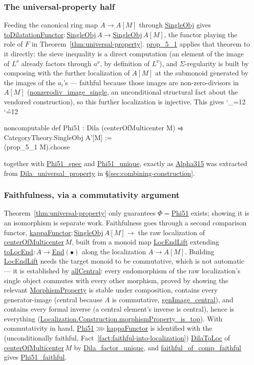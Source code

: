 \documentclass[11pt]{amsart}
\newcommand{\lc}[1]{\url{#1}}
\newenvironment{leancode}{%
  \begingroup
  \catcode`\_=12\relax
  \catcode`\^=12\relax
  \small\ttfamily\raggedright\baselineskip=1.15\baselineskip
  \par\smallskip\noindent
}{%
  \par\smallskip
  \endgroup
}
\theoremstyle{plain}
\theoremstyle{definition}
\theoremstyle{remark}
\begin{document}
\subsubsection*{The universal-property half}
Feeding the canonical ring map $A \to A[M]$ through \lc{SingleObj} gives
\lc{toDilatationFunctor}$: $\lc{SingleObj}$\,A \to $\lc{SingleObj}$\,A[M]$, the functor
playing the role of $F$ in Theorem~\ref{thm:universal-property}. \lc{prop_5_1} applies that
theorem to it directly: the sieve inequality is a direct computation (an element of the image
of $L^\nu$ already factors through $a^\nu$, by definition of $L^\nu$), and $\Sigma$-regularity
is built by composing with the further localization of $A[M]$ at the submonoid generated by
the images of the $a_i$'s --- faithful because those images are non-zero-divisors in $A[M]$
(\lc{nonzerodiv_image_single}, an unconditional structural fact about the vendored
construction), so this further localization is injective. This gives
\begin{leancode}
noncomputable def Phi51 : Dila (centerOfMulticenter M) ⥤ CategoryTheory.SingleObj A'[M] := \\
  (prop_5_1 M).choose \\
\end{leancode}
together with \lc{Phi51_spec} and \lc{Phi51_unique}, exactly as \lc{Alpha315} was extracted
from \lc{Dila_universal_property} in \S\ref{sec:combining-construction}.

\subsubsection*{Faithfulness, via a commutativity argument}
Theorem~\ref{thm:universal-property} only guarantees $\Phi=$\lc{Phi51} exists; showing it is
an isomorphism is separate work. Faithfulness goes through a second comparison functor,
\lc{kappaFunctor}$: $\lc{SingleObj}$\,A[M] \to $ the raw localization of
\lc{centerOfMulticenter}$\,M$, built from a monoid map \lc{LocEndLift} extending
\lc{toLocEnd}$: A \to $\lc{End}$(\bullet)$ along the localization $A \to A[M]$. Building
\lc{LocEndLift} needs the target monoid to be commutative, which is not automatic --- it is
established by \lc{allCentral}: every endomorphism of the raw localization's single object
commutes with every other morphism, proved by showing the relevant \lc{MorphismProperty} is
stable under composition, contains every generator-image (central because $A$ is
commutative, \lc{genImage\_central}), and contains every formal inverse (a central element's
inverse is central), hence is everything
(\lc{Localization.Construction.morphismProperty\_is\_top}). With commutativity in hand,
\lc{Phi51}$\ggg$\lc{kappaFunctor} is identified with the (unconditionally faithful, Fact~\ref{fact:faithful-into-localization})
\lc{DilaToLoc} of \lc{centerOfMulticenter}$\,M$ by \lc{Dila\_factor\_unique}, and
\lc{faithful\_of\_comp\_faithful} gives \lc{Phi51\_faithful}.
\end{document}

